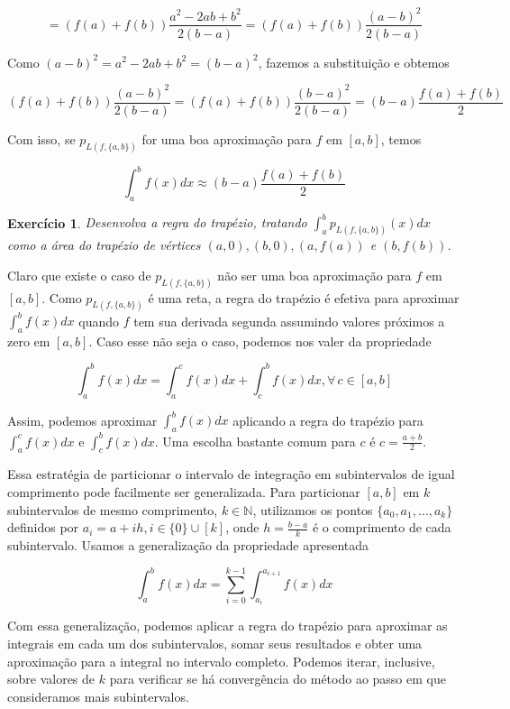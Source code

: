 \documentclass[]{article}
\newtheorem{exercicio}{Exercício}
\numberwithin{equation}{section}
\begin{document}
$$
= (f(a) + f(b)) \frac{a^2 - 2ab + b^2}{2(b - a)} = (f(a) + f(b)) \frac{(a - b)^2}{2(b - a)}
$$

Como $(a - b)^2 = a^2 - 2ab + b^2 = (b - a)^2$, fazemos a substituição e obtemos

$$
(f(a) + f(b)) \frac{(a - b)^2}{2(b - a)} = (f(a) + f(b)) \frac{(b - a)^2}{2(b - a)} = (b - a) \frac{f(a) + f(b)}{2}
$$

Com isso, se $p_{L(f, \{a, b\})}$ for uma boa aproximação para $f$ em $[a, b]$, temos

$$
\int_{a}^{b} f(x) dx \approx (b - a) \frac{f(a) + f(b)}{2}
$$

\begin{exercicio}
	Desenvolva a regra do trapézio, tratando $\int_{a}^{b} p_{L(f, \{a, b\})}(x) dx$ como a área do trapézio de vértices $(a, 0), (b, 0), (a, f(a))$ e $(b, f(b))$.
\end{exercicio}

Claro que existe o caso de $p_{L(f, \{a, b\})}$ não ser uma boa aproximação para $f$ em $[a, b]$. Como $p_{L(f, \{a, b\})}$ é uma reta, a regra do trapézio é efetiva para aproximar $\int_{a}^{b} f(x) dx$ quando $f$ tem sua derivada segunda assumindo valores próximos a zero em $[a, b]$. Caso esse não seja o caso, podemos nos valer da propriedade

$$
\int_{a}^{b} f(x) dx = \int_{a}^{c} f(x) dx + \int_{c}^{b} f(x) dx, \forall\, c \in [a, b]
$$

Assim, podemos aproximar $\int_{a}^{b} f(x) dx$ aplicando a regra do trapézio para $\int_{a}^{c} f(x) dx$ e $\int_{c}^{b} f(x) dx$. Uma escolha bastante comum para $c$ é $c = \frac{a + b}{2}$.

Essa estratégia de particionar o intervalo de integração em subintervalos de igual comprimento pode facilmente ser generalizada. Para particionar $[a, b]$ em $k$ subintervalos de mesmo comprimento, $k \in \mathbb{N}$, utilizamos os pontos $\{a_0, a_1, \dots, a_k\}$ definidos por $a_i = a + ih, i \in \{0\} \cup [k]$, onde $h = \frac{b - a}{k}$ é o comprimento de cada subintervalo. Usamos a generalização da propriedade apresentada

$$
\int_{a}^{b} f(x) dx = \sum_{i = 0}^{k - 1} \int_{a_i}^{a_{i + 1}} f(x) dx
$$

Com essa generalização, podemos aplicar a regra do trapézio para aproximar as integrais em cada um dos subintervalos, somar seus resultados e obter uma aproximação para a integral no intervalo completo. Podemos iterar, inclusive, sobre valores de $k$ para verificar se há convergência do método ao passo em que consideramos mais subintervalos.
\end{document}
